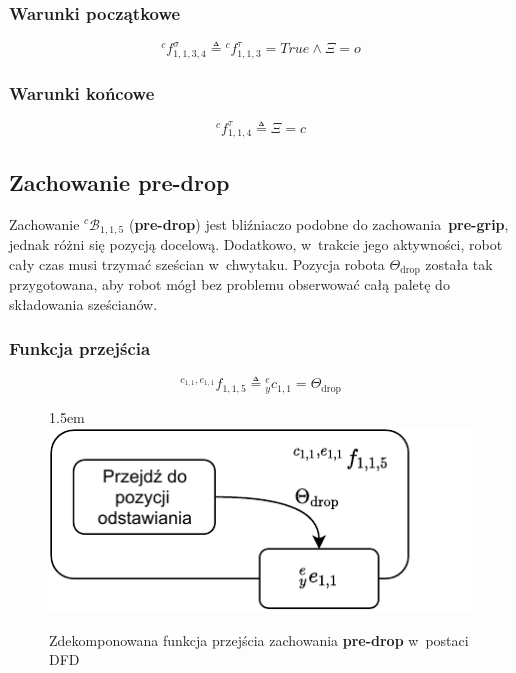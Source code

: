 \subsubsection{Warunki początkowe}
\begin{equation}
    {}^{c}f^{\sigma}_{1,1,3,4} \triangleq {}^{c}f^{\tau}_{1,1,3} = True \land \Xi = o
\end{equation}

\subsubsection{Warunki końcowe}
\begin{equation}
    {}^{c}f^{\tau}_{1,1,4} \triangleq \Xi = c
\end{equation}


\subsection{Zachowanie pre-drop}
\label{subsec:cs-pre-drop}
Zachowanie ${}^{c}\mathcal{B}_{1,1,5}$ (\textbf{pre-drop}) jest bliźniaczo podobne do zachowania~\textbf{pre-grip}, jednak różni się pozycją docelową. Dodatkowo, w~trakcie jego aktywności, robot cały czas musi trzymać sześcian w~chwytaku. Pozycja robota $\Theta_{\mathrm{drop}}$ została tak przygotowana, aby robot mógł bez problemu obserwować całą paletę do składowania sześcianów.

\subsubsection{Funkcja przejścia}
\begin{equation}
    {}^{c_{1,1}, e_{1,1}}f_{1,1,5} \triangleq {}^{e}_{y}c_{1,1} = \Theta_{\mathrm{drop}}
\end{equation}

\begin{figure}[ht]
    \leftskip1.5em
    \includegraphics[width=\columnwidth]{figures/ISR-cs-fp-pre-drop.pdf}
    \caption{Zdekomponowana funkcja przejścia zachowania \textbf{pre-drop} w~postaci DFD}
    \label{fig:cs-fp-pre-drop}
\end{figure}

